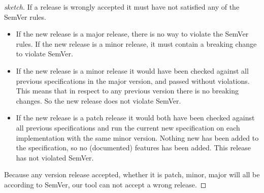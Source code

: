 \begin{proof}[sketch]
If a release is wrongly accepted it must have not satisfied any of the SemVer
rules. 

\begin{itemize}
    \item If the new release is a major release, there is no way to violate the
    SemVer rules. If the new release is a minor release, it must contain a breaking
    change to violate SemVer. 
    \item If the new release is a minor release it would have been checked against all
    previous specifications in the major version, and passed without violations.
    This means that in respect to any previous version there is no breaking
    changes. So the new release does not violate SemVer.\
    \item If the new release is a patch release it would both have been checked against all 
    previous specifications and run the current new specification on each
    implementation with the same minor version. Nothing new has been added to the
    specification, so no (documented) features has been added. This release has not
    violated SemVer.
\end{itemize}

Because any version release accepted, whether it is patch, minor, major will all be according to 
SemVer, our tool can not accept a wrong release.
\end{proof}


